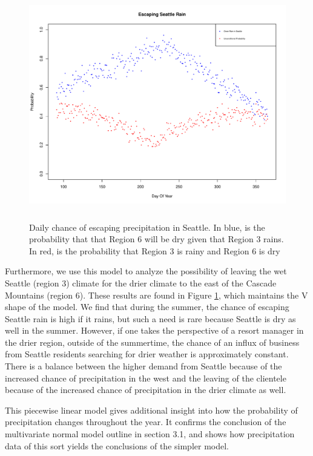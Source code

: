 \documentclass{article}
\begin{document}
\begin{figure}
\centering
\includegraphics[width = .6\textwidth, height = 10cm]{Model2EscapeSeattleRain}
\caption{Daily chance of escaping precipitation in Seattle. In blue, is the probability that that Region 6 will be dry given that Region 3 rains. In red, is the probability that Region 3 is rainy and Region 6 is dry}
\label{fig:m2EscapeSeattle}
\end{figure}

Furthermore, we use this model to analyze the possibility of leaving the wet Seattle (region 3) climate for the drier climate to the east of the Cascade Mountains (region 6). These results are found in Figure \ref{fig:m2EscapeSeattle}, which maintains the V shape of the model. We find that during the summer, the chance of escaping Seattle rain is high if it rains, but such a need is rare because Seattle is dry as well in the summer. 
However, if one takes the perspective of a resort manager in the drier region, outside of the summertime, the chance of an influx of business from Seattle residents searching for drier weather is approximately constant. There is a balance between the higher demand from Seattle because of the increased chance of precipitation in the west and the leaving of the clientele because of the increased chance of precipitation in the drier climate as well.

This piecewise linear model gives additional insight into how the probability of precipitation changes throughout the year. It confirms the conclusion of the multivariate normal model outline in section 3.1, and shows how precipitation data of this sort yields the conclusions of the simpler model. 
\end{document}
